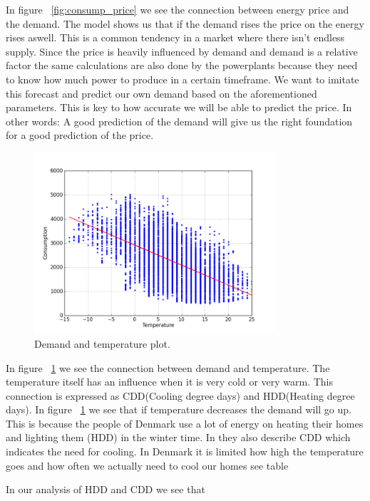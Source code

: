 In figure ~\ref{fig:consump_price} we see the connection between energy price and the demand. The model shows us that if the demand rises the price on the energy rises aswell. This is a common tendency in a market where there isn't endless supply. Since the price is heavily influenced by demand and demand is a relative factor the same calculations are also done by the powerplants because they need to know how much power to produce in a certain timeframe. We want to imitate this forecast and predict our own demand based on the aforementioned parameters. This is key to how accurate we will be able to predict the price. In other words: A good prediction of the demand will give us the right foundation for a good prediction of the price.

\begin{figure}[H]
\centering
\includegraphics[width=0.8\textwidth ]{billeder/energy_price_plots/consump_temp.png}
\caption{Demand and temperature plot.}
\label{fig:consump_temp}
\end{figure}


In figure ~\ref{fig:consump_temp} we see the connection between demand and temperature. The temperature itself has an influence when it is very cold or very warm. This connection is expressed as CDD(Cooling degree days) and HDD(Heating degree days). In figure ~\ref{fig:consump_temp} we see that if temperature decreases the demand will go up. This is because the people of Denmark use a lot of energy on heating their homes and lighting them (HDD) in the winter time. In \cite{19} they also describe CDD which indicates the need for cooling. In Denmark it is limited how high the temperature goes and how often we actually need to cool our homes see table 

In our analysis of HDD and CDD we see that 

